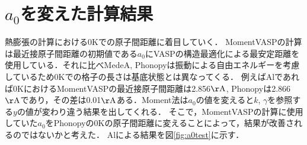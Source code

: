 \section{$a_0$を変えた計算結果}
熱膨張の計算における0Kでの原子間距離に着目していく．
MomentVASPの計算は最近接原子間距離の初期値である$a_0$にVASPの構造最適化による最安定距離を使用している．それに比べMedeA, Phonopyは振動による自由エネルギーを考慮しているため0Kでの格子の長さは基底状態とは異なってくる．
例えばAlであれば0KにおけるMomentVASPの最近接原子間距離は2.856$\mathrm{\AA}$, Phonopyは2.866$\mathrm{\AA}$であり，その差は0.01$\mathrm{\AA}$ある．Moment法は$a_0$の値を変えると$k$, $\gamma$を参照する$y$の値が変わり違う結果を出してくれる．
そこで，MomentVASPの計算に使用していた$a_0$をPhonopyの0Kの原子間距離に変えることによって，結果が改善されるのではないかと考えた．
Alによる結果を図\ref{fig:a0test}に示す．

